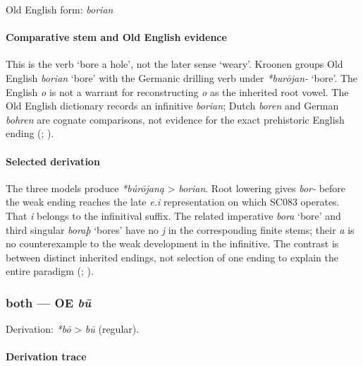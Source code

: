 \documentclass[
  british,
  a4paper,
]{article}
\providecommand{\Recon}[1]{\emph{*#1}}
\begin{document}
Old English form: \emph{borian}

\paragraph{Comparative stem and Old English
evidence}\label{comparative-stem-and-old-english-evidence}

This is the verb `bore a hole', not the later sense `weary'. Kroonen
groups Old English {\emph{borian}} `bore' with the Germanic drilling
verb under \Recon{burōjan-} `bore'. The English \emph{o} is not a
warrant for reconstructing \emph{o} as the inherited root vowel. The Old
English dictionary records an infinitive \emph{borian}; Dutch
\emph{boren} and German \emph{bohren} are cognate comparisons, not
evidence for the exact prehistoric English ending
(;
).

\paragraph{Selected derivation}\label{selected-derivation}

The three models produce \emph{*búrōjaną} \textgreater{} \emph{borian}.
Root lowering gives \emph{bor-} before the weak ending reaches the late
\emph{e.i} representation on which SC083 operates. That \emph{i} belongs
to the infinitival suffix. The related imperative \emph{bora} `bore' and
third singular \emph{boraþ} `bores' have no \emph{j} in the
corresponding finite stems; their \emph{a} is no counterexample to the
weak development in the infinitive. The contrast is between distinct
inherited endings, not selection of one ending to explain the entire
paradigm (; ).

\subsubsection{\texorpdfstring{both --- OE
\emph{bū}}{both --- OE bū}}\label{both-oe-bux16b}

Derivation: \emph{*bō} \textgreater{} \emph{bū} (regular).

\paragraph{Derivation trace}\label{derivation-trace-10}
\end{document}

